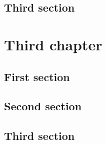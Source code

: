 \documentclass{tstextbook}
\begin{document}
    \section{Third section}
    \Blindtext

    \chapter{Third chapter}

    \begin{summary}
        \blindtext
    \end{summary}

    \section{First section}
    \Blindtext

    \section{Second section}
    \Blindtext

    \section{Third section}
    \Blindtext


    \printbibliography{}


    \printindex
\end{document}
